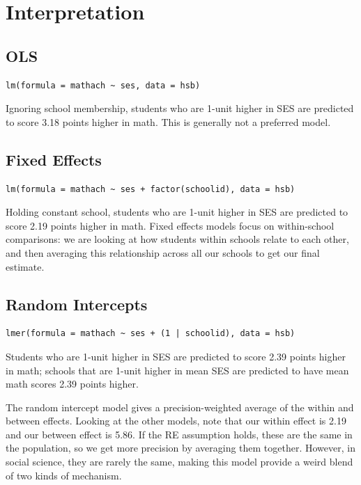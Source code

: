 \documentclass[
  letterpaper,
  DIV=11,
  numbers=noendperiod]{scrreprt}
\begin{document}
\section{Interpretation}\label{interpretation}

\subsection{OLS}\label{ols}

\begin{verbatim}
lm(formula = mathach ~ ses, data = hsb)
\end{verbatim}

Ignoring school membership, students who are 1-unit higher in SES are
predicted to score 3.18 points higher in math. This is generally not a
preferred model.

\subsection{Fixed Effects}\label{fixed-effects}

\begin{verbatim}
lm(formula = mathach ~ ses + factor(schoolid), data = hsb)
\end{verbatim}

Holding constant school, students who are 1-unit higher in SES are
predicted to score 2.19 points higher in math. Fixed effects models
focus on within-school comparisons: we are looking at how students
within schools relate to each other, and then averaging this
relationship across all our schools to get our final estimate.

\subsection{Random Intercepts}\label{random-intercepts}

\begin{verbatim}
lmer(formula = mathach ~ ses + (1 | schoolid), data = hsb)
\end{verbatim}

Students who are 1-unit higher in SES are predicted to score 2.39 points
higher in math; schools that are 1-unit higher in mean SES are predicted
to have mean math scores 2.39 points higher.

The random intercept model gives a precision-weighted average of the
within and between effects. Looking at the other models, note that our
within effect is 2.19 and our between effect is 5.86. If the RE
assumption holds, these are the same in the population, so we get more
precision by averaging them together. However, in social science, they
are rarely the same, making this model provide a weird blend of two
kinds of mechanism.
\end{document}
